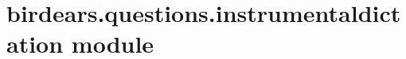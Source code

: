 \documentclass[letterpaper,10pt,english]{sphinxmanual}
\begin{document}
\begin{fulllineitems}

\begin{fulllineitems}
\label{\detokenize{index:birdears.questions.harmonicinterval.HarmonicIntervalQuestion.play_resolution}}
\end{fulllineitems}


\end{fulllineitems}



\section{birdears.questions.instrumentaldictation module}
\label{\detokenize{index:birdears-questions-instrumentaldictation-module}}\label{\detokenize{index:module-birdears.questions.instrumentaldictation}}
\end{document}
